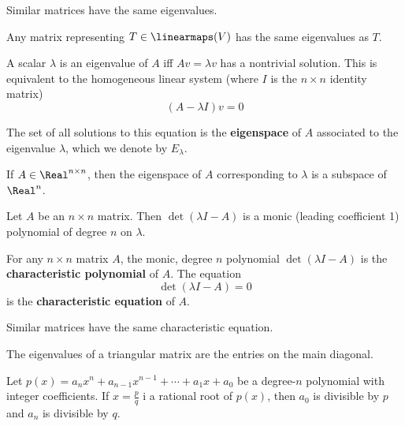 \begin{lemma}
  Similar matrices have the same eigenvalues.

  Any matrix representing $T \in \linearmaps(V)$ has the same eigenvalues as $T$.
\end{lemma}

\begin{definition}[Eigenspace]
  A scalar $\lambda$ is an eigenvalue of $A$ iff $Av = \lambda v$ has a nontrivial solution. This is equivalent to the homogeneous linear system (where $I$ is the $n \times n$ identity matrix)
  \[
    (A - \lambda I) v = 0
  \]

  The set of all solutions to this equation is the \textbf{eigenspace} of $A$ associated to the eigenvalue $\lambda$, which we denote by $E_\lambda$.
\end{definition}

\begin{lemma}
  If $A \in \Real^{n \times n}$, then the eigenspace of $A$ corresponding to $\lambda$ is a subspace of $\Real^n$.
\end{lemma}

\begin{lemma}
  Let $A$ be an $n \times n$ matrix. Then $\det(\lambda I - A)$ is a monic (leading coefficient 1) polynomial of degree $n$ on $\lambda$.
\end{lemma}

\begin{definition}
  For any $n \times n$ matrix $A$, the monic, degree $n$ polynomial $\det(\lambda I - A)$ is the \textbf{characteristic polynomial} of $A$. The equation
  \[
    \det(\lambda I - A) = 0
  \]
  is the \textbf{characteristic equation} of $A$.
\end{definition}

\begin{lemma}
  Similar matrices have the same characteristic equation.
\end{lemma}

\begin{lemma}
  The eigenvalues of a triangular matrix are the entries on the main diagonal.
\end{lemma}

\begin{theorem}
  Let $p(x) = a_n x^n + a_{n-1} x^{n - 1} + \cdots + a_1 x + a_0$ be a degree-$n$ polynomial with integer coefficients. If $x = \frac{p}{q}$ i a rational root of $p(x)$, then $a_0$ is divisible by $p$ and $a_n$ is divisible by $q$.
\end{theorem}
